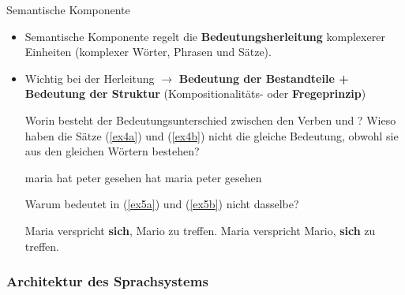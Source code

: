 \begin{frame}{Semantische Komponente}
	
	\begin{itemize}
		\item Semantische Komponente regelt die \textbf{Bedeutungsherleitung} komplexerer Einheiten (komplexer Wörter, Phrasen und Sätze).
		\item<2-> Wichtig bei der Herleitung $\rightarrow$ \textbf{Bedeutung der Bestandteile + Bedeutung der Struktur} (Kompositionalitäts- oder \textbf{Fregeprinzip})
				
\ea Worin besteht der Bedeutungsunterschied zwischen den Verben  und ?
	\ex Wieso haben die Sätze (\ref{ex4a}) und (\ref{ex4b}) nicht die gleiche Bedeutung, obwohl sie aus den gleichen Wörtern bestehen?
	
		\ea maria hat peter gesehen \label{ex4a}
			\ex hat maria peter gesehen \label{ex4b}
		\z 

	\ex Warum bedeutet  in (\ref{ex5a}) und (\ref{ex5b}) nicht dasselbe?

		\ea Maria verspricht \textbf{sich}, Mario zu treffen. \label{ex5a}
			\ex Maria verspricht Mario, \textbf{sich} zu treffen. \label{ex5b}
		\z

\z
	\end{itemize}
	
\end{frame}


\subsubsection{Architektur des Sprachsystems}
		
